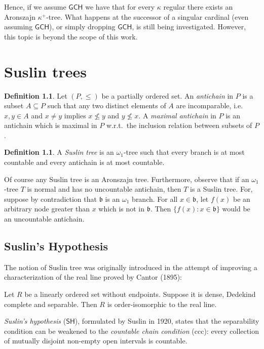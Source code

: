 \documentclass[11pt,a4paper]{report}
\theoremstyle{definition}
\newtheorem{defn}[theorem]{Definition}
\theoremstyle{num.custom-title}
\theoremstyle{custom-title}
\DeclareMathOperator{\sse}{\subseteq}
\newcommand{\GCH}{\ensuremath{\mathsf{GCH}}\xspace}
\newcommand{\SH}{\ensuremath{\mathsf{SH}}\xspace}
\begin{document}
Hence, if we assume \GCH we have that for every $\kappa$ regular there exists an Aronszajn $\kappa^+$-tree. What happens at the successor of a singular cardinal (even assuming \GCH), or simply dropping \GCH, is still being investigated. However, this topic is beyond the scope of this work.


\chapter{Suslin trees}

\begin{defn}
Let $(P, \leq)$ be a partially ordered set. An \emph{antichain} in $P$ is a subset $A \sse P$ such that any two distinct elements of $A$ are incomparable, i.e.\ $x,y \in A$ and $x \neq y$ implies $x \nleq y$ and $y \nleq x$. A \emph{maximal antichain} in $P$ is an antichain which is maximal in $P$ w.r.t.\ the inclusion relation between subsets of $P$.
\end{defn}

\begin{defn}
A \emph{Suslin tree} is an $\omega_1$-tree such that every branch is at most countable and every antichain is at most countable.
\end{defn}

Of course any Suslin tree is an Aronszajn tree. Furthermore, observe that if an $\omega_1$-tree $T$ is normal and has no uncountable antichain, then $T$ is a Suslin tree. For, suppose by contradiction that $\mathfrak{b}$ is an $\omega_1$ branch. For all $x \in \mathfrak{b}$, let $f(x)$ be an arbitrary node greater than $x$ which is not in $\mathfrak{b}$. Then $\{f(x) : x \in \mathfrak{b}\}$ would be an uncountable antichain.

\section{Suslin's Hypothesis}

The notion of Suslin tree was originally introduced in the attempt of improving a characterization of the real line proved by Cantor (1895):
\begin{center}
Let $R$ be a linearly ordered set without endpoints. Suppose it is dense, Dedekind complete and separable. Then $R$ is order-isomorphic to the real line.
\end{center}
\emph{Suslin's hypothesis} (\SH), formulated by Suslin in 1920, states that the separability condition can be weakened to the \emph{countable chain condition} (ccc): every collection of mutually disjoint non-empty open intervals is countable.
\end{document}
